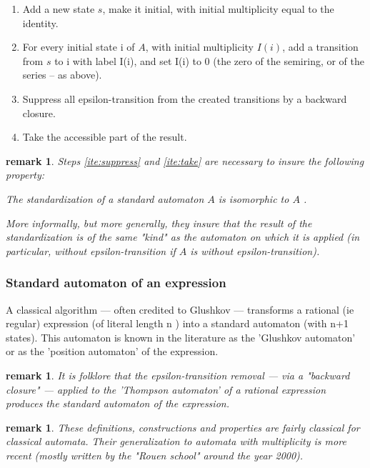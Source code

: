 \documentclass[a4paper]{report}
\newtheorem{remark}     [theorem]{remark}
\begin{document}
\begin{enumerate}
\item Add a new state $s$, make it initial, with initial multiplicity
  equal to the identity.

\item For every initial state i of $A$, with initial multiplicity
  $I(i)$, add a transition from $s$ to i with label I(i), and set I(i)
  to 0 (the zero of the semiring, or of the series -- as above).

\item\label{ite:suppress} Suppress all epsilon-transition from the
  created transitions by a backward closure.

\item\label{ite:take} Take the accessible part of the result.
\end{enumerate}

\begin{remark}
  Steps \autoref{ite:suppress} and \autoref{ite:take} are necessary to
  insure the following property:

  The standardization of a standard automaton $A$ is isomorphic to $A$ .

  More informally, but more generally, they insure that the result of
  the standardization is of the same "kind" as the automaton on which
  it is applied (in particular, without epsilon-transition if $A$ is
  without epsilon-transition).
\end{remark}



\subsubsection{Standard automaton of an expression}

A classical algorithm --- often credited to Glushkov --- transforms a
rational (ie regular) expression (of literal length n ) into a
standard automaton (with n+1 states). This automaton is known in the
literature as the 'Glushkov automaton' or as the 'position automaton'
of the expression.

\begin{remark}
  It is folklore that the epsilon-transition removal --- via a
  "backward closure" --- applied to the 'Thompson automaton' of a
  rational expression produces the standard automaton of the
  expression.
\end{remark}

\begin{remark}
  These definitions, constructions and properties are fairly classical
  for classical automata. Their generalization to automata with
  multiplicity is more recent (mostly written by the "Rouen school"
  around the year 2000).
\end{remark}
\end{document}
